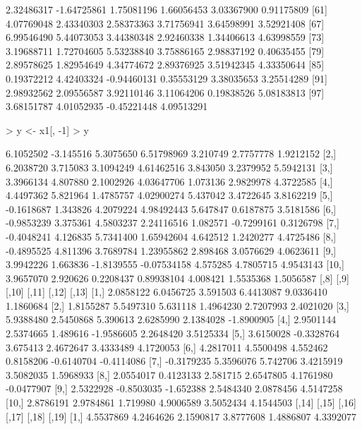 \documentclass[12pt]{article}
\begin{document}
\begin{Schunk}
\begin{Soutput}
 [55]  2.32486317 -1.64725861  1.75081196  1.66056453  3.03367900  0.91175809
 [61]  4.07769048  2.43340303  2.58373363  3.71756941  3.64598991  3.52921408
 [67]  6.99546490  5.44073053  3.44380348  2.92460338  1.34406613  4.63998559
 [73]  3.19688711  1.72704605  5.53238840  3.75886165  2.98837192  0.40635455
 [79]  2.89578625  1.82954649  4.34774672  2.89376925  3.51942345  4.33350644
 [85]  0.19372212  4.42403324 -0.94460131  0.35553129  3.38035653  3.25514289
 [91]  2.98932562  2.09556587  3.92110146  3.11064206  0.19838526  5.08183813
 [97]  3.68151787  4.01052935 -0.45221448  4.09513291
\end{Soutput}
\begin{Sinput}
> y <- x1[, -1] 
> y
\end{Sinput}
\begin{Soutput}
            [,1]      [,2]       [,3]        [,4]     [,5]       [,6]      [,7]
 [1,]  6.1052502 -3.145516  5.3075650  6.51798969 3.210749  2.7757778 1.9212152
 [2,]  6.2038720  3.715083  3.1094249  4.61462516 3.843050  3.2379952 5.5942131
 [3,]  3.3966134  4.807880  2.1002926  4.03647706 1.073136  2.9829978 4.3722585
 [4,]  4.4497362  5.821964  1.4785757  4.02900274 5.437042  3.4722645 3.8162219
 [5,] -0.1618687  1.343826  4.2079224  4.98492443 5.647847  0.6187875 3.5181586
 [6,] -0.9853239  3.375361  4.5803237  2.24116516 1.082571 -0.7299161 0.3126798
 [7,] -0.4048241  4.126835  5.7341400  1.65942604 4.642512  1.2420277 4.4725486
 [8,] -0.4895525  4.811396  3.7689784  1.23955862 2.898468  3.0576629 4.0623611
 [9,]  3.9942226  1.663836 -1.8139555 -0.07534158 4.575285  4.7805715 4.9543143
[10,]  3.9657070  2.920626  0.2208437  0.89938104 4.008421  1.5535368 1.5056587
            [,8]       [,9]     [,10]      [,11]      [,12]      [,13]
 [1,]  2.0858122  6.0456725  3.591503  6.4413087  9.0336410  1.1860684
 [2,]  1.8155287  5.5497310  5.631118  1.4964230  2.7207993  2.4021020
 [3,]  5.9388480  2.5450868  5.390613  2.6285990  2.1384028 -1.8900905
 [4,]  2.9501144  2.5374665  1.489616 -1.9586605  2.2648420  3.5125334
 [5,]  3.6150028 -0.3328764  3.675413  2.4672647  3.4333489  4.1720053
 [6,]  4.2817011  4.5500498  4.552462  0.8158206 -0.6140704 -0.4114086
 [7,] -0.3179235  5.3596076  5.742706  3.4215919  3.5082035  1.5968933
 [8,]  2.0554017  0.4123133  2.581715  2.6547805  4.1761980 -0.0477907
 [9,]  2.5322928 -0.8503035 -1.652388  2.5484340  2.0878456  4.5147258
[10,]  2.8786191  2.9784861  1.719980  4.9006589  3.5052434  4.1544503
           [,14]     [,15]      [,16]      [,17]      [,18]      [,19]
 [1,]  4.5537869 4.2464626  2.1590817  3.8777608  1.4886807  4.3392077

\end{Soutput}
\end{Schunk}
\end{document}
